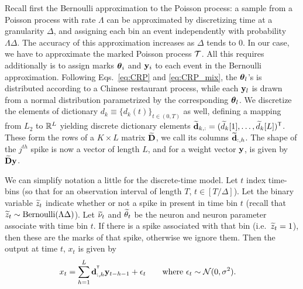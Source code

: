 Recall first the Bernoulli approximation to the Poisson process: a sample from a Poisson process with rate $\Lambda$ can be approximated by discretizing
time at a granularity $\Delta$, and assigning each bin an event independently with probability $\Lambda\Delta$. The accuracy of this approximation increases 
as $\Delta$ tends to $0$.
%
In our case, we have to approximate the marked Poisson process $\mathcal{T}$. All this requires additionally is to assign marks $\boldsymbol{\theta}_i$ and $\mathbf{y}_i$ to each event 
in the Bernoulli approximation. Following Eqs.~\eqref{eq:CRP} and \eqref{eq:CRP_mix}, the $\boldsymbol{\theta}_l$'s is distributed according
to a Chinese restaurant process, while each $\mathbf{y}_l$ is drawn from a normal distribution parametrized by the corresponding $\boldsymbol{\theta}_l$. We discretize the 
elements of dictionary $d_k \equiv \{d_k(t)\}_{t \in (0,T)}$ as well, defining a mapping from $L_2$ to $\mathbb{R}^L$ yielding discrete dictionary elements 
$\widetilde{\mathbf{d}}_{k,:}=(\widetilde{d}_k[1], \ldots, \widetilde{d}_k[L])^{\mathsf{T}}$. These form the rows of a ${K \times L}$ matrix $\widetilde{\mathbf{D}}$, we call its columns
$\widetilde{\mathbf{d}}_{:,h}$. The shape of the $j^{th}$ spike is now a vector of length $L$, and for a weight vector
$\mathbf{y}$, is given by $\widetilde{\mathbf{D}} \mathbf{y}$.

We can simplify notation a little for the discrete-time model. Let $t$ index time-bins (so that for an observation interval of length 
$T$, $t \in [T/\Delta]$).
Let the binary variable $\widetilde{z}_t$ indicate whether or not a spike in present in time bin $t$ (recall that 
$\widetilde{z}_t \sim \text{Bernoulli}(\Lambda \Delta)$). Let
$\widetilde{\nu}_t$ and $\widetilde{\theta}_t$ be the neuron and neuron parameter associate with time bin $t$. If there is a spike associated with that bin (i.e.\ 
$\widetilde{z}_t = 1$), then these are the marks of that spike, otherwise we ignore them.
Then the output at time $t$, $x_t$ is given by
\begin{align}
  x_t = \sum_{h = 1}^L \mathbf{d}_{:,h}^{^{\mathsf{T}}} \mathbf{y}_{t-h-1} + \epsilon_t &\text{\qquad where $\epsilon_t \sim \mathcal{N}(0,\sigma^2)$.} 
\end{align}
